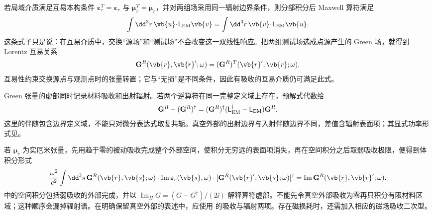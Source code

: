 若局域介质满足互易本构条件
$\boldsymbol\varepsilon_r^T=\boldsymbol\varepsilon_r$ 与
$\boldsymbol\mu_r^T=\boldsymbol\mu_r$，并对两组场采用同一辐射边界条件，则分部积分后 Maxwell 算符满足
\begin{equation}
{
\int\dd^3 r\,\vb{u}\!\cdot\!\mathsf L_{\rm EM}\vb{v}
=\int\dd^3 r\,\vb{v}\!\cdot\!\mathsf L_{\rm EM}\vb{u}.}
\label{eq:maxwell-bilinear-reciprocity-dp68}
\end{equation}
这条式子只是说：在互易介质中，交换“源场”和“测试场”不会改变这一双线性响应。把两组测试场选成点源产生的 Green 场，就得到 Lorentz 互易关系
\begin{equation}
 {
 \mathbf G^R(\vb{r},\vb{r}';\omega)
 =(\mathbf G^R)^T(\vb{r}',\vb{r};\omega).}
 \label{eq:maxwell-green-reciprocity-r16}\end{equation}
互易性约束交换源点与观测点时的张量转置；它与“无损”是不同条件，因此有吸收的互易介质仍可满足此式。

Green 张量的虚部同时记录材料吸收和出射辐射。若两个逆算符在同一完整定义域上存在，预解式代数给
\begin{equation}
 {
 \mathbf G^R-(\mathbf G^R)^\dagger
 =(\mathbf G^R)^\dagger
 (\mathsf L_{\rm EM}^\dagger-\mathsf L_{\rm EM})
 \mathbf G^R.}
 \label{eq:resolvent-imag-identity-r12}
\end{equation}
这里的伴随包含边界定义域，不能只对微分表达式取复共轭。真空外部的出射边界与入射伴随边界不同，差值含辐射表面项；其显式功率形式见。

若 $\boldsymbol\mu_r$ 为实厄米张量，先用趋于零的被动吸收完成整个外部空间，使积分无穷远的表面项消失，再在空间积分之后取弱吸收极限，便得到体积分形式
\begin{equation}
 {
 \frac{\omega^2}{c^2}
 \int\dd^3 s\,
 \mathbf G^R(\vb{r},\vb{s};\omega)
 \cdot\operatorname{Im}\boldsymbol\varepsilon_r(\vb{s},\omega)
 \cdot[\mathbf G^R(\vb{r}',\vb{s};\omega)]^\dagger
 =\operatorname{Im}\mathbf G^R(\vb{r},\vb{r}';\omega).}
 \label{eq:green-optical-identity-SI-r12}
\end{equation}
 中的空间积分包括弱吸收的外部完成，并以 $\operatorname{Im}_{H}G=(G-G^\dagger)/(2\ii)$ 解释算符虚部。不能先令真空外部吸收为零再只积分有限材料区域；这种顺序会漏掉辐射谱。在明确保留真空外部的表述中，应使用 的吸收与辐射两项。存在磁损耗时，还需加入相应的磁场吸收二次型。
